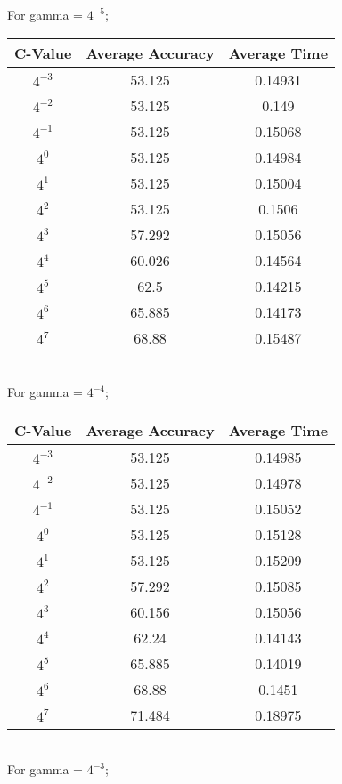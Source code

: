\documentclass[letter,11pt]{article}
\begin{document}
For gamma = $4^{-5}$;

\begin{tabular}{|c| c |c |} 
	\hline
	C-Value & Average Accuracy & Average Time \\ [0.5ex] 			
	\hline
	$4^{-3}$ & 53.125  & 0.14931 \\ [0.5ex] 
	\hline
	$4^{-2}$ & 53.125 & 0.149  \\ 
	\hline
	$4^{-1}$ &  53.125 	  & 0.15068\\
	\hline
	$4^{0}$ &  53.125  & 0.14984\\
	\hline
	$4^{1}$ & 53.125  & 0.15004\\
	\hline
	$4^{2}$ &  53.125 & 0.1506\\
	\hline
	$4^{3}$ &   57.292 & 0.15056\\
	\hline
	$4^{4}$ &  60.026  & 0.14564\\
	\hline
	$4^{5}$ &  62.5  & 0.14215\\
	\hline
	$4^{6}$ &  65.885  & 0.14173\\
	\hline
	$4^{7}$ &  68.88 & 0.15487\\
	\hline	
\end{tabular}\\

For gamma = $4^{-4}$;

\begin{tabular}{|c| c |c |} 
	\hline
	C-Value & Average Accuracy & Average Time \\ [0.5ex] 			
	\hline
	$4^{-3}$ & 53.125  & 0.14985 \\ [0.5ex] 
	\hline
	$4^{-2}$ & 53.125 & 0.14978  \\ 
	\hline
	$4^{-1}$ &  53.125 	  & 0.15052\\
	\hline
	$4^{0}$ &  53.125  & 0.15128\\
	\hline
	$4^{1}$ & 53.125  & 0.15209\\
	\hline
	$4^{2}$ &  57.292 & 0.15085\\
	\hline
	$4^{3}$ &   60.156 & 0.15056\\
	\hline
	$4^{4}$ &  62.24  & 0.14143\\
	\hline
	$4^{5}$ &   65.885  & 0.14019\\
	\hline
	$4^{6}$ &  68.88  & 0.1451\\
	\hline
	$4^{7}$ & 71.484 & 0.18975\\
	\hline	
\end{tabular}\\

For gamma = $4^{-3}$;
\end{document}

